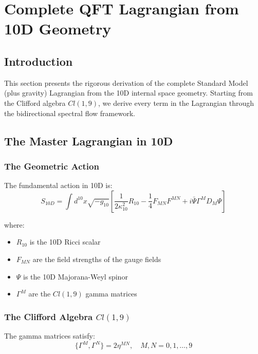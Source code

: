 \section{Complete QFT Lagrangian from 10D Geometry}
\label{sec:qft_lagrangian_complete}

\subsection{Introduction}

This section presents the rigorous derivation of the complete Standard Model (plus gravity) Lagrangian from the 10D internal space geometry. Starting from the Clifford algebra $Cl(1,9)$, we derive every term in the Lagrangian through the bidirectional spectral flow framework.

\subsection{The Master Lagrangian in 10D}

\subsubsection{The Geometric Action}

The fundamental action in 10D is:
\begin{equation}
    S_{10D} = \int d^{10}x \sqrt{-g_{10}} \left[ \frac{1}{2\kappa_{10}^2}R_{10} - \frac{1}{4}F_{MN}F^{MN} + i\bar{\Psi}\Gamma^M D_M \Psi \right]
\end{equation}

where:
\begin{itemize}
    \item $R_{10}$ is the 10D Ricci scalar
    \item $F_{MN}$ are the field strengths of the gauge fields
    \item $\Psi$ is the 10D Majorana-Weyl spinor
    \item $\Gamma^M$ are the $Cl(1,9)$ gamma matrices
\end{itemize}

\subsubsection{The Clifford Algebra $Cl(1,9)$}

The gamma matrices satisfy:
\begin{equation}
    \{\Gamma^M, \Gamma^N\} = 2\eta^{MN}, \quad M,N = 0,1,\ldots,9
\end{equation}

